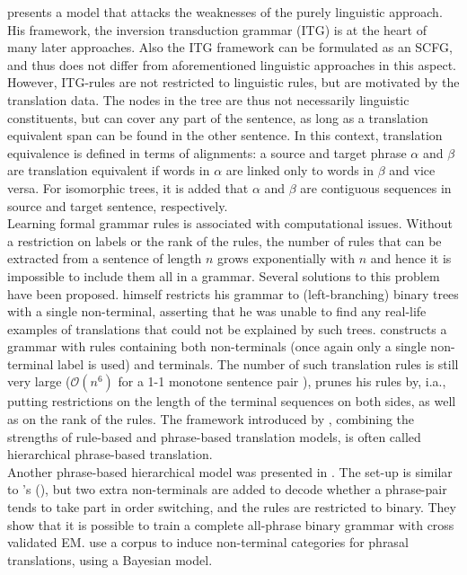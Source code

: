 \documentclass[a4paper, 11pt]{report}
\theoremstyle{definition}
\theoremstyle{plain}
\def\citepos#1{\citeauthor{#1}'s (\citeyear{#1})}
\begin{document}
\cite{wu1997stochastic} presents a model that attacks the weaknesses of the purely linguistic approach. His framework, the inversion transduction grammar (ITG) is at the heart of many later approaches. Also the ITG framework can be formulated as an SCFG, and thus does not differ from aforementioned linguistic approaches in this aspect. However, ITG-rules are not restricted to linguistic rules, but are motivated by the translation data. The nodes in the tree are thus not necessarily linguistic constituents, but can cover any part of the sentence, as long as a translation equivalent span can be found in the other sentence. In this context, translation equivalence is defined in terms of alignments: a source and target phrase $\alpha$ and $\beta$ are translation equivalent if words in $\alpha$ are linked only to words in $\beta$ and vice versa. For isomorphic trees, it is added that $\alpha$ and $\beta$ are contiguous sequences in source and target sentence, respectively.\\
Learning formal grammar rules is associated with computational issues. Without a restriction on labels or the rank of the rules, the number of rules that can be extracted from a sentence of length $n$ grows exponentially with $n$ and hence it is impossible to include them all in a grammar. Several solutions to this problem have been proposed. \citeauthor{wu1997stochastic} himself restricts his grammar to (left-branching) binary trees with a single non-terminal, asserting that he was unable to find any real-life examples of translations that could not be explained by such trees. \cite{chiang2005hierarchical} constructs a grammar with rules containing both non-terminals (once again only a single non-terminal label is used) and terminals. The number of such translation rules is still very large ($\mathcal{O}(n^6)$ for a 1-1 monotone sentence pair \citep{quirk2005dependency}), \citeauthor{chiang2005hierarchical} prunes his rules by, i.a., putting restrictions on the length of the terminal sequences on both sides, as well as on the rank of the rules. The framework introduced by \citeauthor{chiang2007hierarchical}, combining the strengths of rule-based and phrase-based translation models, is often called hierarchical phrase-based translation. \\
Another phrase-based hierarchical model was presented in \cite{mylonakis2010learning}. The set-up is similar to \citepos{chiang2007hierarchical}, but two extra non-terminals are added to decode whether a phrase-pair tends to take part in order switching, and the rules are restricted to binary. They show that it is possible to train a complete all-phrase binary grammar with cross validated EM. \cite{blunsom2008bayesian} use a corpus to induce non-terminal categories for phrasal translations, using a Bayesian model.
\end{document}
